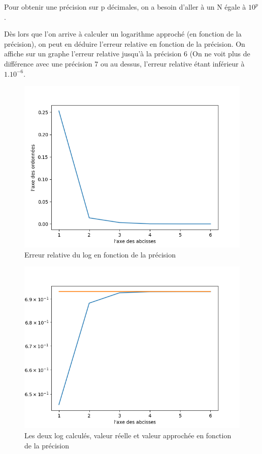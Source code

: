 \documentclass{article}
\begin{document}
Pour obtenir une précision sur p décimales, on a besoin d'aller à un N égale à ${10^{p}}$. 


Dès lors que l'on arrive à calculer un logarithme approché (en fonction de la précision), on peut en déduire l'erreur relative en fonction de la précision. On affiche sur un graphe l'erreur relative jusqu'à la précision 6 (On ne voit plus de différence avec une précision 7 ou au dessus, l'erreur relative étant inférieur à ${1.10^{-6}}$.


\begin{figure}[!ht]
    \centering
    \includegraphics[scale=0.5]{erreur_relative.png}
    \caption{Erreur relative du log en fonction de la précision}
    \label{fig:log_prec}
\end{figure}

\begin{figure}[!ht]
    \centering
    \includegraphics[scale=0.5]{graphes_log.png}
    \caption{Les deux log calculés, valeur réelle et valeur approchée en fonction de la précision}
    \label{fig:compare_log}
\end{figure}
\end{document}
